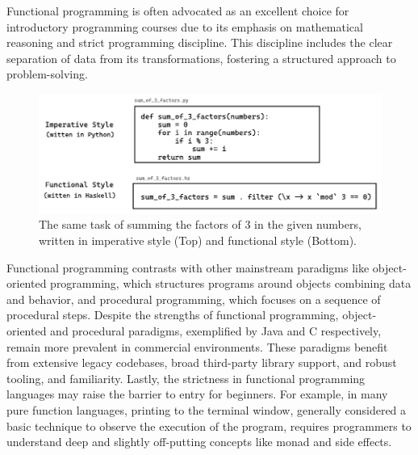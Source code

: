 Functional programming is often advocated as an excellent choice for introductory programming courses due to its emphasis on mathematical reasoning and strict programming discipline. This discipline includes the clear separation of data from its transformations, fostering a structured approach to problem-solving.


\begin{figure}[hbt]
  \includegraphics[width=\linewidth]{ImperativeFunctional}
  \caption{
    \label{fig:imperative-vs-functional}
   The same task of summing the factors of 3 in the given numbers, written in imperative style (Top) and functional style (Bottom).
    }
\end{figure}


Functional programming contrasts with other mainstream paradigms like object-oriented programming, which structures programs around objects combining data and behavior, and procedural programming, which focuses on a sequence of procedural steps. Despite the strengths of functional programming, object-oriented and procedural paradigms, exemplified by Java and C respectively, remain more prevalent in commercial environments. These paradigms benefit from extensive legacy codebases, broad third-party library support, and robust tooling, and familiarity. Lastly, the strictness in functional programming languages may raise the barrier to entry for beginners. For example, in many pure function languages, printing to the terminal window, generally considered a basic technique to observe the execution of the program, requires programmers to understand deep and slightly off-putting concepts like monad and side effects.  


